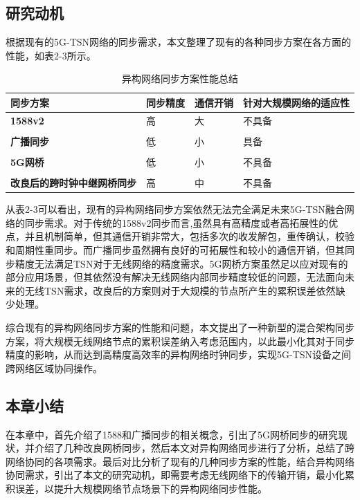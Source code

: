 \documentclass[UTF8,a4paper,12pt]{ctexart}
\numberwithin{equation}{section}
\begin{document}
\subsection{研究动机}
根据现有的5G-TSN网络的同步需求，本文整理了现有的各种同步方案在各方面的性能，如表2-3所示。
\begin{table}[!htbp]
	\centering
	\caption{异构网络同步方案性能总结}
	\begin{tabular}{lp{3cm}p{3cm}p{4cm}}
		\toprule  %
		\textbf{同步方案}   &\textbf{同步精度}  & \textbf{通信开销}  & \textbf{针对大规模网络的适应性}  \\
		\midrule  %
		\textbf{1588v2}    & 高   & 大    & 不具备                \\
		\\
		\textbf{广播同步} &  低 &  小 & 具备   \\
		\\
		\textbf{5G网桥} &低   &小     &不具备  \\
		\\
		\textbf{改良后的跨时钟中继网桥同步} &高  & 中        & 不具备    \\
		\bottomrule %
	\end{tabular}
\end{table}
从表2-3可以看出，现有的异构网络同步方案依然无法完全满足未来5G-TSN融合网络的同步需求。对于传统的1588v2同步而言,虽然具有高精度或者高拓展性的优点，并且机制简单，但其通信开销非常大，包括多次的收发解包，重传确认，校验和周期性重同步。而广播同步虽然拥有良好的可拓展性和较小的通信开销，但其同步精度无法满足TSN对于无线网络的精度需求。5G网桥方案虽然足以应对现有的部分应用场景，但其依然没有解决无线网络内部同步精度较低的问题，无法面向未来的无线TSN需求，改良后的方案则对于大规模的节点所产生的累积误差依然缺少处理。

综合现有的异构网络同步方案的性能和问题，本文提出了一种新型的混合架构同步方案，将大规模无线网络节点的累积误差纳入考虑范围内，以此最小化其对于同步精度的影响，从而达到高精度高效率的异构网络时钟同步，实现5G-TSN设备之间跨网络区域协同操作。
\subsection{本章小结}
在本章中，首先介绍了1588和广播同步的相关概念，引出了5G网桥同步的研究现状，并介绍了几种改良网桥同步，然后本文对异构网络同步进行了分析，总结了跨网络协同的各项需求。最后对比分析了现有的几种同步方案的性能，结合异构网络协同需求，引出了本文的研究动机，即需要考虑无线网络下的传输开销，最小化累积误差，以提升大规模网络节点场景下的异构网络同步性能。
\end{document}
